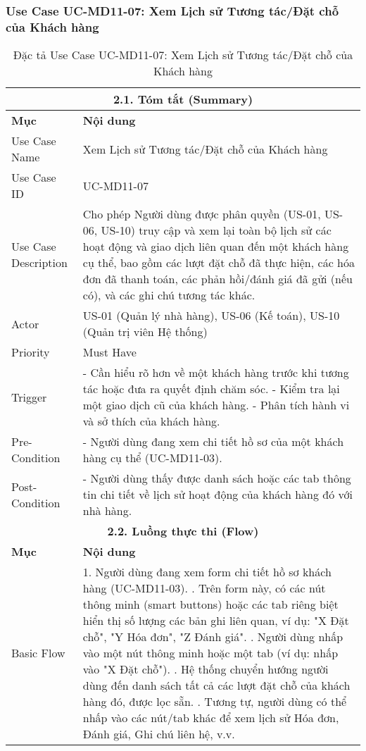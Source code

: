 \subsubsection{Use Case UC-MD11-07: Xem Lịch sử Tương tác/Đặt chỗ của Khách hàng}
\begin{longtable}{|m{4cm}|p{11cm}|}
\caption{Đặc tả Use Case UC-MD11-07: Xem Lịch sử Tương tác/Đặt chỗ của Khách hàng} \label{tab:uc_md11_07_view_customer_history} \\
\hline
\multicolumn{2}{|c|}{\textbf{2.1. Tóm tắt (Summary)}} \\
\hline
\textbf{Mục} & \textbf{Nội dung} \\
\hline
\endhead
\midrule
\endfoot
\bottomrule
\endlastfoot
Use Case Name & Xem Lịch sử Tương tác/Đặt chỗ của Khách hàng \\
\hline
Use Case ID & UC-MD11-07 \\
\hline
Use Case Description & Cho phép Người dùng được phân quyền (US-01, US-06, US-10) truy cập và xem lại toàn bộ lịch sử các hoạt động và giao dịch liên quan đến một khách hàng cụ thể, bao gồm các lượt đặt chỗ đã thực hiện, các hóa đơn đã thanh toán, các phản hồi/đánh giá đã gửi (nếu có), và các ghi chú tương tác khác. \\
\hline
Actor & US-01 (Quản lý nhà hàng), US-06 (Kế toán), US-10 (Quản trị viên Hệ thống) \\
\hline
Priority & Must Have \\
\hline
Trigger & - Cần hiểu rõ hơn về một khách hàng trước khi tương tác hoặc đưa ra quyết định chăm sóc. \newline - Kiểm tra lại một giao dịch cũ của khách hàng. \newline - Phân tích hành vi và sở thích của khách hàng. \\
\hline
Pre-Condition & - Người dùng đang xem chi tiết hồ sơ của một khách hàng cụ thể (UC-MD11-03). \\
\hline
Post-Condition & - Người dùng thấy được danh sách hoặc các tab thông tin chi tiết về lịch sử hoạt động của khách hàng đó với nhà hàng. \\
\hline
\multicolumn{2}{|c|}{\textbf{2.2. Luồng thực thi (Flow)}} \\
\hline
\textbf{Mục} & \textbf{Nội dung} \\
\hline
Basic Flow & 1. Người dùng đang xem form chi tiết hồ sơ khách hàng (UC-MD11-03). \newline 2. Trên form này, có các nút thông minh (smart buttons) hoặc các tab riêng biệt hiển thị số lượng các bản ghi liên quan, ví dụ: "X Đặt chỗ", "Y Hóa đơn", "Z Đánh giá". \newline 3. Người dùng nhấp vào một nút thông minh hoặc một tab (ví dụ: nhấp vào "X Đặt chỗ"). \newline 4. Hệ thống chuyển hướng người dùng đến danh sách tất cả các lượt đặt chỗ của khách hàng đó, được lọc sẵn. \newline 5. Tương tự, người dùng có thể nhấp vào các nút/tab khác để xem lịch sử Hóa đơn, Đánh giá, Ghi chú liên hệ, v.v. \\

\end{longtable}
